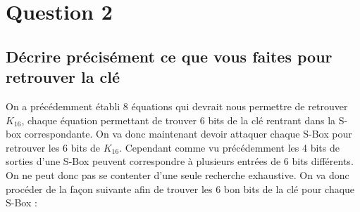 \documentclass[a4paper,11pt]{article}
\begin{document}
	\section{Question 2} 
	\subsection{Décrire précisément ce que vous faites pour retrouver la clé}
	On a précédemment établi 8 équations qui devrait nous permettre de retrouver $K_{16}$, chaque équation permettant de trouver 6 bits de la clé rentrant dans la S-box correspondante.
	On va donc maintenant devoir attaquer chaque S-Box pour retrouver les 6 bits de $K_{16}$. Cependant comme vu précédemment les 4 bits de sorties d'une S-Box peuvent correspondre à plusieurs entrées de 6 bits différents. On ne peut donc pas se contenter d'une seule recherche exhaustive. On va donc procéder de la façon suivante afin de trouver les 6 bon bits de la clé pour chaque S-Box : \\
\end{document}
